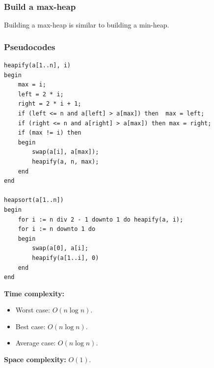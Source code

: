 \documentclass[12pt,a4paper]{article}
\begin{document}
\subsubsection{Build a max-heap}
Building a max-heap is similar to building a min-heap.
\subsubsection{Pseudocodes}
\lstset{language=Pascal} 
\begin{lstlisting}[caption = {Heap sort}]
heapify(a[1..n], i)
begin
	max = i;
	left = 2 * i;
	right = 2 * i + 1;
	if (left <= n and a[left] > a[max]) then  max = left;
	if (right <= n and a[right] > a[max]) then max = right;
	if (max != i) then 
	begin
		swap(a[i], a[max]);
		heapify(a, n, max);
	end
end

heapsort(a[1..n])
begin
	for i := n div 2 - 1 downto 1 do heapify(a, i);
	for i := n downto 1 do 
	begin
		swap(a[0], a[i];
		heapify(a[1..i], 0)
	end
end
\end{lstlisting}
\textbf{Time complexity:} \cite{heap}
\begin{itemize}
\item Worst case: $O \left( {n \log n} \right).$
\item Best case: $O \left( {n \log n} \right).$
\item Average case: $O \left( {n \log n} \right).$
\end{itemize}
\textbf{Space complexity:} $O \left( {1} \right).$ \cite{heap}
\end{document}
